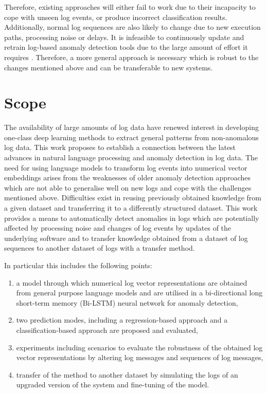 Therefore, existing approaches will either fail to work due to their incapacity to cope with unseen log events, or produce incorrect classification results. Additionally, normal log sequences are also likely to change due to new execution paths, processing noise or delays. It is infeasible to continuously update and retrain log-based anomaly detection tools due to the large amount of effort it requires \cite{zhang2019robust}. Therefore, a more general approach is necessary which is robust to the changes mentioned above and can be transferable to new systems.








\section{Scope\label{sec:scope}}
The availability of large amounts of log data have renewed  interest in developing one-class deep learning methods to extract general patterns from non-anomalous log data. This work proposes to establish a connection between the latest advances in natural language processing and anomaly detection in log data. The need for using language models to transform log events into numerical vector embeddings arises from the weaknesses of older anomaly detection approaches which are not able to generalise well on new logs and cope with the challenges mentioned above. Difficulties exist in reusing previously obtained knowledge from a given dataset and transferring it to a differently structured dataset. This work provides a means to automatically detect anomalies in logs which are potentially affected by processing noise and changes of log events by updates of the underlying software and to transfer knowledge obtained from a dataset of log sequences to another dataset of logs with a transfer method.

In particular this includes the following points:
\begin{enumerate}
	\item a model through which numerical log vector representations are obtained from general purpose language models and are utilised in a bi-directional long short-term memory (Bi-LSTM) neural network for anomaly detection,
	\item two prediction modes, including a regression-based approach and a classification-based approach are proposed and evaluated,
	\item experiments including scenarios to evaluate the robustness of the obtained log vector representations by altering log messages and sequences of log messages,
	\item transfer of the method to another dataset by simulating the logs of an upgraded version of the system and fine-tuning of the model.
\end{enumerate}

